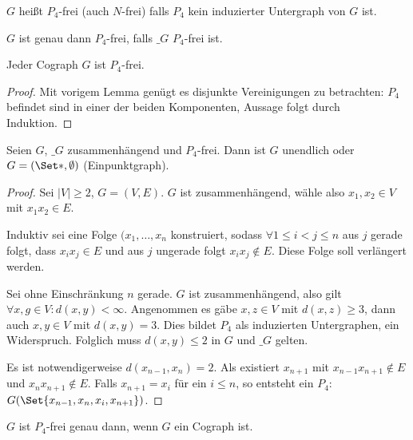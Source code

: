 
\begin{df}
    $G$ heißt $P_4$-frei (auch $N$-frei) falls $P_4$ kein induzierter Untergraph von $G$ ist.
\end{df}

\begin{lem}
    $G$ ist genau dann $P_4$-frei, falls $\_G$ $P_4$-frei ist.
\end{lem}

\begin{kor}
    Jeder Cograph $G$ ist $P_4$-frei.
    \begin{proof}
        Mit vorigem Lemma genügt es disjunkte Vereinigungen zu betrachten: $P_4$ befindet sind in einer der beiden Komponenten, Aussage folgt durch Induktion.
    \end{proof}
\end{kor}

\begin{st}
    Seien $G$, $\_G$ zusammenhängend und $P_4$-frei.
    Dann ist $G$ unendlich oder $G = (\Set \ast, \emptyset)$ (Einpunktgraph).
    \begin{proof}
        Sei $|V| \ge 2$, $G = (V, E)$.
        $G$ ist zusammenhängend, wähle also $x_1, x_2 \in V$ mit $x_1x_2 \in E$.

        Induktiv sei eine Folge $(x_1, \dotsc, x_n$ konstruiert, sodass $\forall 1 \le i < j \le n$ aus $j$ gerade folgt, dass $x_ix_j \in E$ und aus $j$ ungerade folgt $x_ix_j \not\in E$.
        Diese Folge soll verlängert werden.

        Sei ohne Einschränkung $n$ gerade.
        $G$ ist zusammenhängend, also gilt $\forall x, g \in V: d(x,y) < \infty$.
        Angenommen es gäbe $x, z \in V$ mit $d(x,z) \ge 3$, dann auch $x,y \in V$ mit $d(x,y) = 3$.
        Dies bildet $P_4$ als induzierten Untergraphen, ein Widerspruch.
        Folglich muss $d(x,y) \le 2$ in $G$ und $\_G$ gelten.

        Es ist notwendigerweise $d(x_{n-1},x_n) = 2$.
        Als existiert $x_{n+1}$ mit $x_{n-1} x_{n+1} \not\in E$ und $x_n x_{n+1} \not\in E$.
        Falls $x_{n+1} = x_i$ für ein $i \le n$, so entsteht ein $P_4$: $G(\Set{x_{n-1}, x_n, x_i, x_{n+1}})$.
    \end{proof}
\end{st}

\begin{kor}
    $G$ ist $P_4$-frei genau dann, wenn $G$ ein Cograph ist.
\end{kor}


